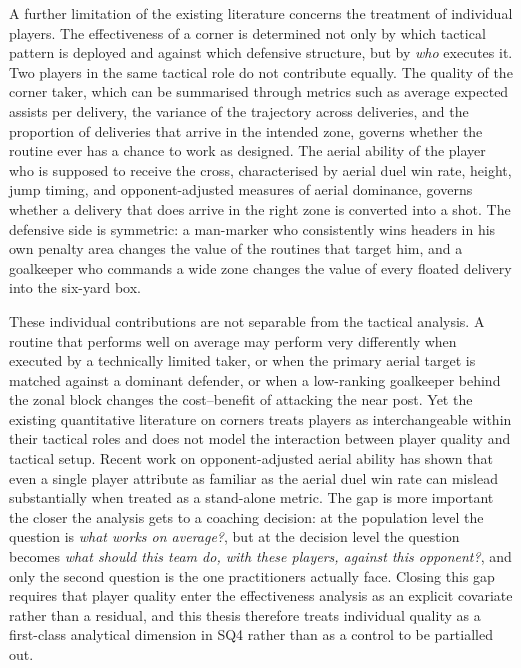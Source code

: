 A further limitation of the existing literature concerns the treatment of
individual players. The effectiveness of a corner is determined not only by
which tactical pattern is deployed and against which defensive structure, but
by \emph{who} executes it. Two players in the same tactical role do not
contribute equally. The quality of the corner taker, which can be summarised
through metrics such as average expected assists per delivery, the variance
of the trajectory across deliveries, and the proportion of deliveries that
arrive in the intended zone, governs whether the routine ever has a chance to
work as designed. The aerial ability of the player who is supposed to receive
the cross, characterised by aerial duel win rate, height, jump timing, and
opponent-adjusted measures of aerial dominance, governs whether a delivery
that does arrive in the right zone is converted into a shot. The defensive
side is symmetric: a man-marker who consistently wins headers in his own
penalty area changes the value of the routines that target him, and a
goalkeeper who commands a wide zone changes the value of every floated
delivery into the six-yard box.

These individual contributions are not separable from the tactical analysis.
A routine that performs well on average may perform very differently when
executed by a technically limited taker, or when the primary aerial target is
matched against a dominant defender, or when a low-ranking goalkeeper
behind the zonal block changes the cost--benefit of attacking the near post.
Yet the existing quantitative literature on corners treats players as
interchangeable within their tactical roles and does not model the
interaction between player quality and tactical setup. Recent work on
opponent-adjusted aerial ability \citep{Kim2024} has shown that even a
single player attribute as familiar as the aerial duel win rate can mislead
substantially when treated as a stand-alone metric. The gap is more important
the closer the analysis gets to a coaching decision: at the population level
the question is \emph{what works on average?}, but at the decision level the
question becomes \emph{what should this team do, with these players, against
this opponent?}, and only the second question is the one practitioners
actually face. Closing this gap requires that player quality enter the
effectiveness analysis as an explicit covariate rather than a residual, and
this thesis therefore treats individual quality as a first-class analytical
dimension in SQ4 rather than as a control to be partialled out.

